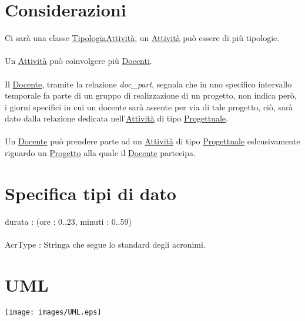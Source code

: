 \documentclass[12pt, letterpaper]{article}
\newcommand{\acc}{\\\hphantom{}\\}
\begin{document}
\section{Considerazioni}
Ci sarà una classe \underline{TipologiaAttività}, un \underline{Attività} può essere di
più tipologie.\acc Un \underline{Attività} può coinvolgere più \underline{Docenti}.\acc
Il \underline{Docente}, tramite la relazione \textit{doc\_part}, segnala che in uno specifico
intervallo temporale fa parte di un gruppo di realizzazione di un progetto, non indica però, i giorni
specifici in cui un docente sarà assente per via di tale progetto, ciò, sarà dato dalla
relazione dedicata nell'\underline{Attività} di tipo \underline{Progettuale}.\acc
Un \underline{Docente} può prendere parte ad un \underline{Attività} di tipo \underline{Progettuale}
eslcusivamente riguardo un  \underline{Progetto} alla quale il \underline{Docente} partecipa.
\newpage
\section{Specifica tipi di dato}
durata : (ore : 0..23, minuti : 0..59)\acc
AcrType : Stringa che segue lo standard degli acronimi.
\newpage
\section{UML}\begin{center}
    \texttt{[image: images/UML.eps]}
\end{center}
\end{document}
